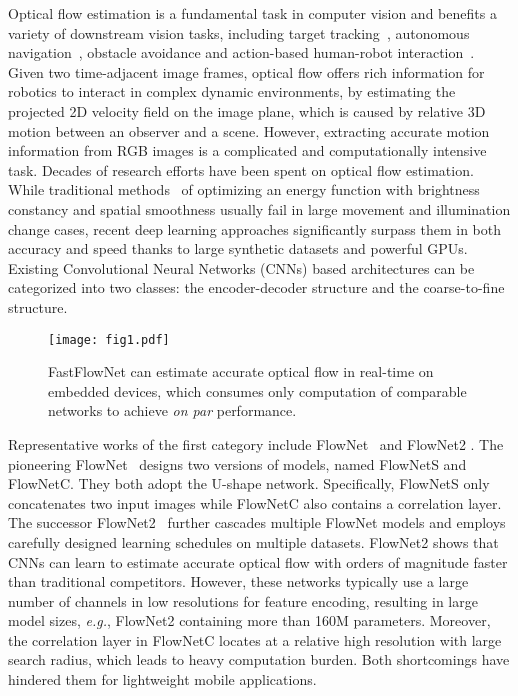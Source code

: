 \documentclass[letterpaper, 10 pt, conference]{ieeeconf}
\begin{document}
Optical flow estimation is a fundamental task in computer vision and 
benefits 
a variety of downstream vision tasks, including target tracking~\cite{9093517}, autonomous navigation~\cite{8460569}, obstacle avoidance \cite{Kahlouche_2007} and action-based human-robot interaction~\cite{8793825,Yang_2021}. Given two time-adjacent image frames,  optical flow
offers rich information for robotics to interact in complex dynamic environments,
by estimating the projected 2D velocity field on the image plane, which is caused by relative 3D motion between an observer and a scene.  
However, extracting  accurate 
motion information from RGB images 
is a complicated and computationally intensive task.
Decades of research efforts have been spent on optical flow estimation. 
While traditional methods~\cite{Horn_1981,Brox_2011,Zach_2007,Kroeger_2016} of optimizing an energy function with brightness constancy and spatial smoothness usually fail in large movement and illumination change cases, recent deep learning approaches significantly surpass them in both accuracy and speed thanks to large synthetic datasets and powerful GPUs. Existing Convolutional Neural Networks (CNNs) based architectures can be categorized into two classes:
the 
encoder-decoder structure and the coarse-to-fine structure.

\begin{figure}[t]
	\centering
	\vspace{0.8 em}
	\texttt{[image: fig1.pdf]}
	\caption{FastFlowNet can estimate accurate optical flow in real-time on embedded devices, which consumes only  computation of comparable networks to achieve \textit{on par} performance.}
	\label{fig1}
\end{figure}



Representative works of the first category 
include  
FlowNet~\cite{Fischer_2015} and FlowNet2 \cite{Ilg_2017}. The pioneering FlowNet~\cite{Fischer_2015} designs  
two versions of models,  named FlowNetS and FlowNetC. They both adopt the U-shape network. Specifically, FlowNetS only concatenates two input images while FlowNetC also contains a correlation layer. The successor FlowNet2~\cite{Ilg_2017} further cascades multiple FlowNet models and 
employs 
carefully designed learning schedules on multiple datasets. FlowNet2 shows that 
CNNs can learn to estimate accurate optical flow with orders of magnitude faster than traditional competitors. However, these networks typically use a 
large number of channels in low resolutions for feature encoding, resulting in large
model sizes, \textit{e.g.}, FlowNet2 containing more than 160M parameters. Moreover, the correlation layer in FlowNetC locates at a relative high resolution with large search radius, which leads to heavy computation burden. Both shortcomings  
have hindered them for lightweight mobile applications.
\end{document}
